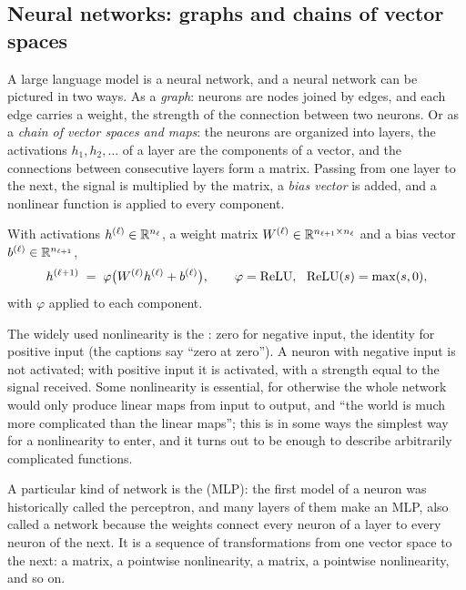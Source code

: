 \subsection{Neural networks: graphs and chains of vector spaces}\label{sec:L6-nn}
A large language model is a neural network, and a neural network can be pictured in two ways. As a \emph{graph}: neurons are nodes joined by edges, and each edge carries a weight, the strength of the connection between two neurons. Or as a \emph{chain of vector spaces and maps}: the neurons are organized into layers, the activations $h_1,h_2,\dots$ of a layer are the components of a vector, and the connections between consecutive layers form a matrix. Passing from one layer to the next, the signal is multiplied by the matrix, a \emph{bias vector} is added, and a nonlinear function is applied to every component.

\begin{defn}\label{def:L6-layer}
With activations $h^{(\ell)}\in\mathbb{R}^{n_\ell}$, a weight matrix $W^{(\ell)}\in\mathbb{R}^{n_{\ell+1}\times n_\ell}$ and a bias vector $b^{(\ell)}\in\mathbb{R}^{n_{\ell+1}}$,
\[
  h^{(\ell+1)}\;=\;\varphi\big(W^{(\ell)}h^{(\ell)}+b^{(\ell)}\big),\qquad \varphi=\mathrm{ReLU},\ \ \mathrm{ReLU}(s)=\max(s,0),
\]
with $\varphi$ applied to each component.
\end{defn}
\noindent The widely used nonlinearity is the : zero for negative input, the identity for positive input (the captions say ``zero at zero''). A neuron with negative input is not activated; with positive input it is activated, with a strength equal to the signal received. Some nonlinearity is essential, for otherwise the whole network would only produce linear maps from input to output, and ``the world is much more complicated than the linear maps''; this is in some ways the simplest way for a nonlinearity to enter, and it turns out to be enough to describe arbitrarily complicated functions.

A particular kind of network is the  (MLP): the first model of a neuron was historically called the perceptron, and many layers of them make an MLP, also called a  network because the weights connect every neuron of a layer to every neuron of the next. It is a sequence of transformations from one vector space to the next: a matrix, a pointwise nonlinearity, a matrix, a pointwise nonlinearity, and so on.

